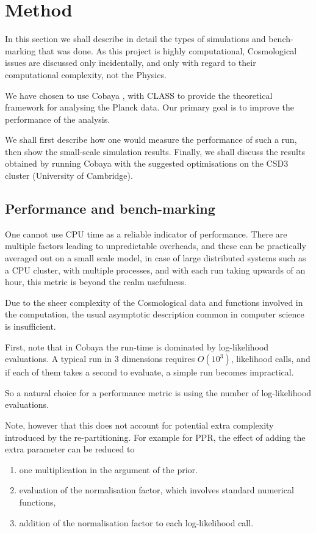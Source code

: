\documentclass[usenatbib]{mnras}
\begin{document}
\section{Method}
\label{sec:orgf03ddb2}
In this section we shall describe in detail the types of simulations
and bench-marking that was done. As this project is highly
computational, Cosmological issues are discussed only incidentally,
and only with regard to their computational complexity, not the
Physics.

We have chosen to use Cobaya \citep{cobaya}, with CLASS to provide the
theoretical framework for analysing the Planck \citep{Planck}
data. Our primary goal is to improve the performance of the
analysis.

We shall first describe how one would measure the performance of
such a run, then show the small-scale simulation results. Finally,
we shall discuss the results obtained by running Cobaya with the
suggested optimisations on the CSD3 cluster (University of Cambridge).


\subsection{Performance and bench-marking}
\label{sec:orgbfd8b80}
One cannot use CPU time as a reliable indicator of
performance. There are multiple factors leading to unpredictable
overheads, and these can be practically averaged out on a small
scale model, in case of large distributed systems such as a CPU
cluster, with multiple processes, and with each run taking upwards
of an hour, this metric is beyond the realm usefulness.

Due to the sheer complexity of the Cosmological data and functions
involved in the computation, the usual asymptotic description
common in computer science is insufficient. 

First, note that in Cobaya  the run-time is dominated
by log-likelihood evaluations. A typical run in 3 dimensions
requires \(O(10^{3})\), likelihood calls, and if each of them takes a
second to evaluate, a simple run becomes impractical. 

So a natural choice for a performance metric is using the number of
log-likelihood evaluations. 

Note, however that this does not account for potential extra
complexity introduced by the re-partitioning. For example for PPR,
the effect of adding the extra parameter can be reduced to
\begin{enumerate}
\item one multiplication in the argument of the prior.
\item evaluation of the normalisation factor, which involves standard
numerical functions,
\item addition of the normalisation factor to each log-likelihood call.
\end{enumerate}
\end{document}
